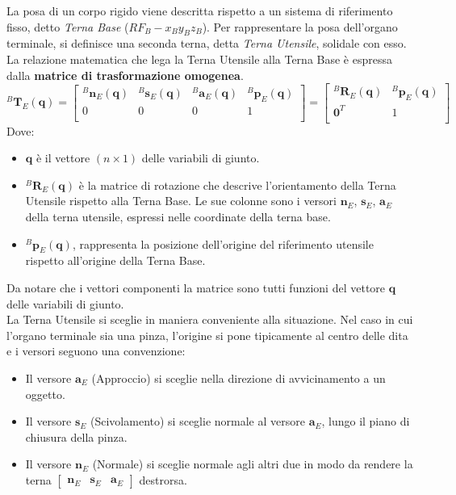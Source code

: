 ﻿\documentclass[11pt, a4paper]{article}
\begin{document}
La posa di un corpo rigido viene descritta rispetto a un sistema di riferimento fisso, detto \textit{Terna Base} ($RF_{B} - x_{B}y_{B}z_{B}$). Per rappresentare la posa dell'organo terminale, si definisce una seconda terna, detta \textit{Terna Utensile}, solidale con esso. La relazione matematica che lega la Terna Utensile alla Terna Base è espressa dalla \textbf{matrice di trasformazione omogenea}.
\[
    ^{B}\mathbf{T}_{E}(\mathbf{q}) =
    \begin{bmatrix}
        ^{B}\mathbf{n}_{E}(\mathbf{q}) & ^{B}\mathbf{s}_{E}(\mathbf{q}) & ^{B}\mathbf{a}_{E}(\mathbf{q}) & ^{B}\mathbf{p}_{E}(\mathbf{q})\\
        0 & 0 & 0 & 1\\
    \end{bmatrix}
    =
    \begin{bmatrix}
        ^{B}\mathbf{R}_{E}(\mathbf{q}) & ^{B}\mathbf{p}_{E}(\mathbf{q})\\
        \mathbf{0}^{T} & 1\\
    \end{bmatrix}
\]
Dove:
\begin{itemize}
    \item $\mathbf{q}$ è il vettore $(n \times 1)$ delle variabili di giunto.
    \item $^{B}\mathbf{R}_{E}(\mathbf{q})$ è la matrice di rotazione che descrive l'orientamento della Terna Utensile rispetto alla Terna Base. Le sue colonne sono i versori $\mathbf{n}_{E}$, $\mathbf{s}_{E}$, $\mathbf{a}_{E}$ della terna utensile, espressi nelle coordinate della terna base.
    \item $^{B}\mathbf{p}_{E}(\mathbf{q})$, rappresenta la posizione dell'origine del riferimento utensile rispetto all'origine della Terna Base.
\end{itemize}
Da notare che i vettori componenti la matrice sono tutti funzioni del vettore $\mathbf{q}$ delle variabili di giunto.\\
La Terna Utensile si sceglie in maniera conveniente alla situazione. Nel caso in cui l'organo terminale sia una pinza, l'origine si pone tipicamente al centro delle dita e i versori seguono una convenzione:
\begin{itemize}
    \item Il versore $\mathbf{a}_{E}$ (Approccio) si sceglie nella direzione di avvicinamento a un oggetto.
    \item Il versore $\mathbf{s}_{E}$ (Scivolamento) si sceglie normale al versore $\mathbf{a}_{E}$, lungo il piano di chiusura della pinza.
    \item Il versore $\mathbf{n}_{E}$ (Normale) si sceglie normale agli altri due in modo da rendere la terna \( \begin{bmatrix} \mathbf{n}_{E} & \mathbf{s}_{E} & \mathbf{a}_{E} \end{bmatrix} \) destrorsa.
\end{itemize}
\end{document}
